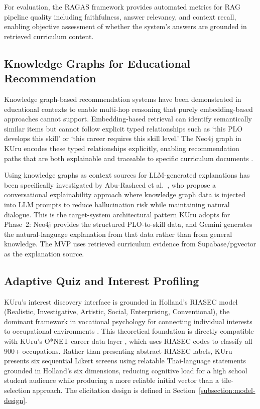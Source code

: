 For evaluation, the RAGAS framework \cite{es2023ragas} provides automated metrics for RAG pipeline quality including faithfulness, answer relevancy, and context recall, enabling objective assessment of whether the system's answers are grounded in retrieved curriculum content.

\subsection{Knowledge Graphs for Educational Recommendation}
\label{subsection:kg-education}

Knowledge graph-based recommendation systems have been demonstrated in educational contexts to enable multi-hop reasoning that purely embedding-based approaches cannot support. Embedding-based retrieval can identify semantically similar items but cannot follow explicit typed relationships such as `this PLO develops this skill' or `this career requires this skill level.' The Neo4j graph in KUru encodes these typed relationships explicitly, enabling recommendation paths that are both explainable and traceable to specific curriculum documents \cite{aburasheed2025llmkg, pmc2023kgempowerment}.

Using knowledge graphs as context sources for LLM-generated explanations has been specifically investigated by Abu-Rasheed et al.\ \cite{aburasheed2024kgcontext}, who propose a conversational explainability approach where knowledge graph data is injected into LLM prompts to reduce hallucination risk while maintaining natural dialogue. This is the target-system architectural pattern KUru adopts for Phase~2: Neo4j provides the structured PLO-to-skill data, and Gemini generates the natural-language explanation from that data rather than from general knowledge. The MVP uses retrieved curriculum evidence from Supabase/pgvector as the explanation source.

\subsection{Adaptive Quiz and Interest Profiling}
\label{subsection:interest-profiling}

KUru's interest discovery interface is grounded in Holland's RIASEC model (Realistic, Investigative, Artistic, Social, Enterprising, Conventional), the dominant framework in vocational psychology for connecting individual interests to occupational environments \cite{holland1997}. This theoretical foundation is directly compatible with KUru's O*NET career data layer \cite{onet2024}, which uses RIASEC codes to classify all 900+ occupations. Rather than presenting abstract RIASEC labels, KUru presents six sequential Likert screens using relatable Thai-language statements grounded in Holland's six dimensions, reducing cognitive load for a high school student audience while producing a more reliable initial vector than a tile-selection approach. The elicitation design is defined in Section~\ref{subsection:model-design}.

